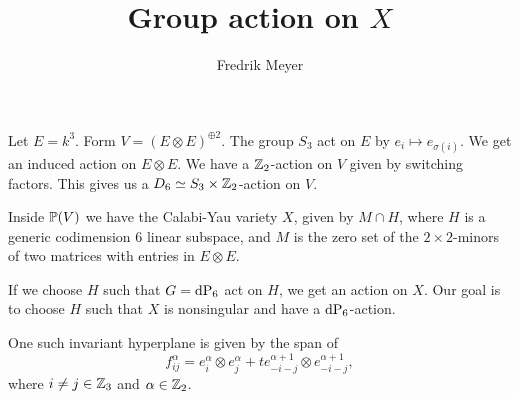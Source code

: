 \documentclass[11pt, english]{article}
\begin{document}
\title{Group action on $X$}
\author{Fredrik Meyer}
\maketitle

Let $E=k^3$. Form $V = (E \otimes E)^{\oplus 2}$. The group $S_3$ act on $E$ by $e_i \mapsto e_{\sigma(i)}$. We get an induced action on $E \otimes E$. We have a $\mathbb{Z}_2$-action on $V$ given by switching factors. This gives us a $D_6 \simeq S_3 \times \mathbb{Z}_2$-action on $V$.

Inside $\mathbb{P}(V)$ we have the Calabi-Yau variety $X$, given by $M \cap H$, where $H$ is a generic codimension $6$ linear subspace, and $M$ is the zero set of the $2 \times 2$-minors of two matrices with entries in $E \otimes E$.

If we choose $H$ such that $G=\dP6$ act on $H$, we get an action on $X$. Our goal is to choose $H$ such that $X$ is nonsingular and have a $\dP6$-action.

\begin{lemma}
One such invariant hyperplane is given by the span of
$$
f_{ij}^\alpha = e_i^\alpha \otimes e_j^\alpha + t e_{-i-j}^{\alpha+1} \otimes e_{-i-j}^{\alpha+1},
$$
where $i \neq j \in \mathbb{Z}_3$ and $\alpha \in \mathbb{Z}_2$. 
\end{lemma}
\end{document}
